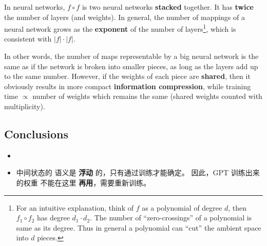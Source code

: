 \begin{preview}
\begin{minipage}{\textwidth}
In neural networks, $f \circ f$ is two neural networks \textbf{stacked} together.  It has \textbf{twice} the number of layers (and weights).  In general, the number of mappings of a neural network grows as the \textbf{exponent} of the number of layers\footnote{For an intuitive explanation, think of $f$ as a polynomial of degree $d$, then $f_1 \circ f_2$ has degree $d_1 \cdot d_2$.  The number of ``zero-crossings'' of a polynomial is same as its degree.  Thus in general a polynomial can ``cut'' the ambient space into $d$ pieces.}, which is consistent with $|f|\cdot|f|$.

In other words, the number of maps representable by a big neural network is the same as if the network is broken into smaller pieces, as long as the layers add up to the same number.  However, if the weights of each piece are \textbf{shared}, then it obviously results in more compact \textbf{information compression}, while training time $\propto$ number of weights which remains the same (shared weights counted with multiplicity).

\subsection{Conclusions}

\begin{itemize}
	\item {}

	\item 中间状态的 语义是 \textbf{浮动} 的，只有通过训练才能确定。 因此，GPT 训练出来的权重 不能在这里 \textbf{再用}，需要重新训练。

\end{itemize}

\end{minipage}
\end{preview}

